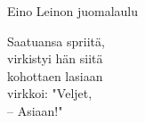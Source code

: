 \begin{song}{Eino Leinon juomalaulu}
	
	
	Saatuansa spriitä,\\
	virkistyi hän siitä\\
	kohottaen lasiaan\\
	virkkoi: "Veljet,\\
	-- Asiaan!"

	
\end{song}
